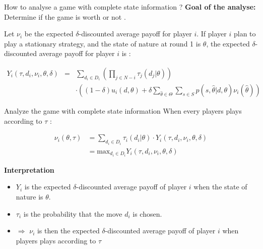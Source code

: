 \begin{frame}{How to analyse a game with complete state information ?}
\textbf{Goal of the analyse:} Determine if the game is worth or not .

Let $\nu_i$ be the expected $\delta$-discounted average payoff for player $i$. If player $i$ plan to play a stationary strategy,  and the state of nature at round 1 is $\theta$, the expected $\delta$-discounted average payoff for player $i$ is :
\begin{small}
\begin{eqnarray}
Y_i(\tau, d_i, \nu_i, \theta, \delta) &=&  \sum_{d_i \in D_i} \left( \prod_{j \in N-i} \tau_j(d_j|\theta) \right) \\ && \cdot  \left(  (1-\delta) u_i(d,\theta) + \delta \sum_{\hat{\theta} \in \Theta} \sum_{s \in S} p(s,\hat{\theta} |d,\theta) \nu_i (\hat{\theta}) \right) \label{eq:comp1}
\end{eqnarray}  
\end{small}

\end{frame}


\begin{frame}{Analyze the game with complete state information}
When every players plays according to $\tau$ :

\begin{small}
\begin{align}
\nu_i(\theta, \tau) &=   \sum_{d_i \in D_i} \tau_i(d_i|\theta) \cdot Y_i(\tau, d_i, \nu_i, \theta, \delta)\\
&= \text{max}_{d_i \in D_i} Y_i(\tau, d_i, \nu_i, \theta, \delta) \label{eq:comp2}
\end{align}
\end{small}

\textbf{\color{green} Interpretation}

\begin{itemize}
	\item $Y_i$ is the expected $\delta$-discounted average payoff of player $i$ when the state of nature is $\theta$.
	\item $\tau_i$ is the probability that the move $d_i$ is chosen.
	\item $\Rightarrow$ $\nu_i$ is then the expected $\delta$-discounted average payoff of player $i$ when players plays according to $\tau$
\end{itemize}
\end{frame}

